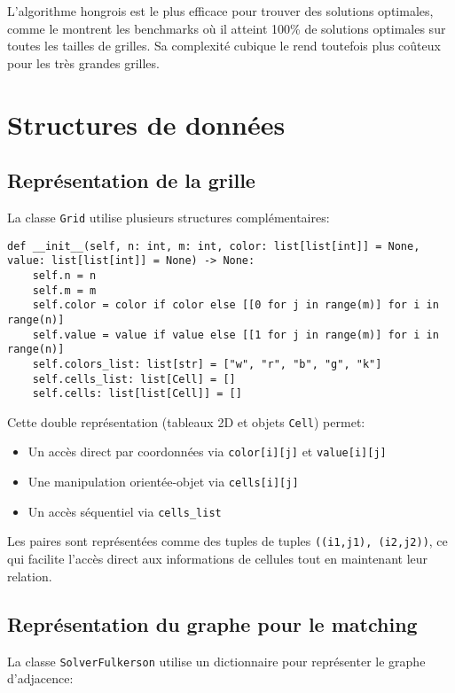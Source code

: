 \documentclass[11pt, a4paper]{article}
\begin{document}
L'algorithme hongrois est le plus efficace pour trouver des solutions optimales, comme le montrent les benchmarks où il atteint 100\% de solutions optimales sur toutes les tailles de grilles. Sa complexité cubique le rend toutefois plus coûteux pour les très grandes grilles.

\section{Structures de données}
\label{sec:structures}

\subsection{Représentation de la grille}

La classe \texttt{Grid} utilise plusieurs structures complémentaires:

\begin{lstlisting}[caption=Initialisation de la grille]
def __init__(self, n: int, m: int, color: list[list[int]] = None, value: list[list[int]] = None) -> None:
    self.n = n
    self.m = m
    self.color = color if color else [[0 for j in range(m)] for i in range(n)]
    self.value = value if value else [[1 for j in range(m)] for i in range(n)]
    self.colors_list: list[str] = ["w", "r", "b", "g", "k"]
    self.cells_list: list[Cell] = []
    self.cells: list[list[Cell]] = []
\end{lstlisting}

Cette double représentation (tableaux 2D et objets \texttt{Cell}) permet:
\begin{itemize}
    \item Un accès direct par coordonnées via \texttt{color[i][j]} et \texttt{value[i][j]}
    \item Une manipulation orientée-objet via \texttt{cells[i][j]}
    \item Un accès séquentiel via \texttt{cells\_list}
\end{itemize}

Les paires sont représentées comme des tuples de tuples \texttt{((i1,j1), (i2,j2))}, ce qui facilite l'accès direct aux informations de cellules tout en maintenant leur relation.

\subsection{Représentation du graphe pour le matching}

La classe \texttt{SolverFulkerson} utilise un dictionnaire pour représenter le graphe d'adjacence:
\end{document}
